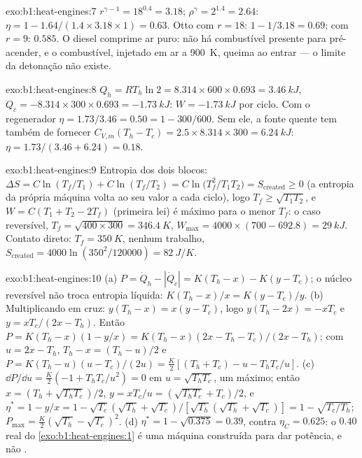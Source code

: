 \begin{solution}{exo:b1:heat-engines:7}
$r^{\gamma-1} = 18^{0.4} = 3.18$; $\rho^\gamma = 2^{1.4} = 2.64$: $\eta = 1 -
1.64/(1.4 \times 3.18 \times 1) = 0.63$. Otto com $r = 18$: $1 - 1/3.18 = 0.69$;
com $r = 9$: $0.585$. O diesel comprime ar puro: não há combustível
presente para pré-acender, e o combustível, injetado em ar a \qty{900}{K}, queima
ao entrar --- o limite da detonação não existe.
\end{solution}

\begin{solution}{exo:b1:heat-engines:8}
$Q_h = RT_h\ln2 = 8.314 \times 600 \times 0.693 = \qty{3.46}{kJ}$, $Q_c = -8.314
\times 300 \times 0.693 = \qty{-1.73}{kJ}$: $W = \qty{-1.73}{kJ}$ por ciclo. Com
o regenerador $\eta = 1.73/3.46 = 0.50 = 1 - 300/600$. Sem ele, a fonte
quente tem também de fornecer $C_{V,m}(T_h - T_c) = 2.5 \times 8.314 \times 300 =
\qty{6.24}{kJ}$: $\eta = 1.73/(3.46 + 6.24) = 0.18$.
\end{solution}

\begin{solution}{exo:b1:heat-engines:9}
Entropia dos dois blocos: $\Delta S = C\ln(T_f/T_1) + C\ln(T_f/T_2) =
C\ln\bigl(T_f^2/T_1T_2\bigr) = S_{\mathrm{created}} \geq 0$ (a entropia da própria
máquina volta ao seu valor a cada ciclo), logo $T_f \geq \sqrt{T_1T_2}$, e
$W = C(T_1 + T_2 - 2T_f)$ (primeira lei) é máximo para o menor $T_f$:
o caso reversível, $T_f = \sqrt{400 \times 300} = \qty{346.4}{K}$,
$W_{\max} = 4000 \times (700 - 692.8) = \qty{29}{kJ}$. Contato direto: $T_f =
\qty{350}{K}$, nenhum trabalho, $S_{\mathrm{created}} = 4000\ln(350^2/120000) =
\qty{82}{J/K}$.
\end{solution}

\begin{solution}{exo:b1:heat-engines:10}
(a) $P = \dot Q_h - |\dot Q_c| = K(T_h - x) - K(y - T_c)$; o núcleo reversível
não troca entropia líquida: $K(T_h - x)/x = K(y - T_c)/y$. (b) Multiplicando em cruz:
$y(T_h - x) = x(y - T_c)$, logo $y(T_h - 2x) = -xT_c$ e $y = xT_c/(2x - T_h)$.
Então $P = K(T_h - x)(1 - y/x) = K(T_h - x)(2x - T_h - T_c)/(2x - T_h)$; com
$u = 2x - T_h$, $T_h - x = (T_h - u)/2$ e $P = K(T_h - u)(u - T_c)/(2u) =
\tfrac{K}{2}[(T_h + T_c) - u - T_hT_c/u]$. (c) $\dd P/\dd u = \tfrac K2(-1 +
T_hT_c/u^2) = 0$ em $u = \sqrt{T_hT_c}$, um máximo; então $x = (T_h +
\sqrt{T_hT_c})/2$, $y = xT_c/u = (\sqrt{T_hT_c} + T_c)/2$, e $\eta^\ast = 1 - y/x
= 1 - \sqrt{T_c}(\sqrt{T_h} + \sqrt{T_c})/[\sqrt{T_h}(\sqrt{T_h} + \sqrt{T_c})] = 1 -
\sqrt{T_c/T_h}$; $P_{\max} = \tfrac K2(\sqrt{T_h} - \sqrt{T_c})^2$. (d)
$\eta^\ast = 1 - \sqrt{0.375} = 0.39$, contra $\eta_C = 0.625$: o $0.40$ real
do \cref{exo:b1:heat-engines:1} é uma máquina construída para dar potência, e não
.
\end{solution}

